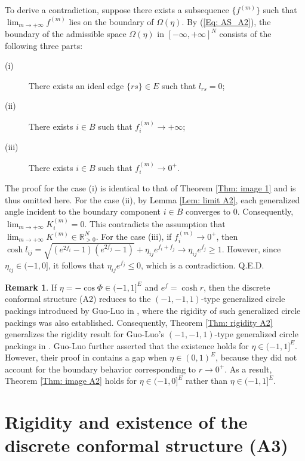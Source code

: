 \documentclass[12pt]{amsart}
\theoremstyle{definition}
\newtheorem{remark}[theorem]{Remark}
\def\qed{\hfill{Q.E.D.}\smallskip}
\begin{document}
To derive a contradiction, suppose there exists a subsequence $\{f^{(m)}\}$ such that $\lim_{m\rightarrow +\infty}f^{(m)}$ lies on the boundary of $\Omega(\eta)$.
By (\ref{Eq: AS_A2}), the boundary of the admissible space $\Omega(\eta)$ in $[-\infty,+\infty]^N$ consists of the following three parts:
\begin{description}
\item[(i)]
There exists an ideal edge $\{rs\}\in E$ such that $l_{rs}=0$;
\item[(ii)]
There exists $i\in B$ such that $f_i^{(m)}\rightarrow +\infty$;
\item[(iii)]
There exists $i\in B$ such that $f_i^{(m)}\rightarrow 0^+$.
\end{description}
The proof for the case (i) is identical to that of Theorem \ref{Thm: image 1} and is thus omitted here.
For the case (ii), by Lemma \ref{Lem: limit A2}, each generalized angle incident to the boundary component $i\in B$ converges to 0.
Consequently, $\lim_{m\rightarrow +\infty}K_i^{(m)}=0$.
This contradicts the assumption that $\lim_{m\rightarrow +\infty}K^{(m)}\in \mathbb{R}^N_{>0}$.
For the case (iii), if $f_i^{(m)}\rightarrow 0^+$, then
$\cosh l_{ij}=\sqrt{(e^{2f_i}-1)(e^{2f_j}-1)}
+\eta_{ij}e^{f_i+f_j}\rightarrow \eta_{ij}e^{f_j}\geq 1$.
However, since $\eta_{ij}\in (-1,0]$, it follows that $\eta_{ij}e^{f_j}\leq0$, which is a contradiction.
\qed

\begin{remark}
If $\eta=-\cos \Phi\in (-1,1]^E$ and $e^f=\cosh r$,
then the discrete conformal structure (A2) reduces to the $(-1,-1,1)$-type generalized circle packings introduced by Guo-Luo in \cite{GL2},
where the rigidity of such generalized circle packings was also established. 
Consequently, Theorem \ref{Thm: rigidity A2} generalizes the rigidity result for Guo-Luo's  $(-1,-1,1)$-type generalized circle packings in \cite{GL2}.
Guo-Luo further asserted that the existence holds for $\eta\in (-1,1]^E$.
However, their proof in \cite{GL2} contains a gap when  $\eta\in (0,1)^E$,
because they did not account for the boundary behavior corresponding to $r\rightarrow 0^+$.
As a result, Theorem \ref{Thm: image A2} holds for $\eta\in (-1,0]^E$ rather than $\eta\in (-1,1]^E$.
\end{remark}


\section{Rigidity and existence of the discrete conformal structure (A3)}\label{section A3}
\end{document}
